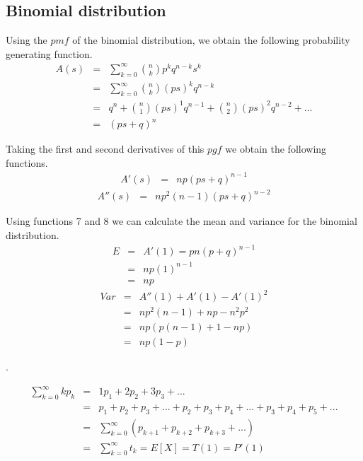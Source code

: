 \documentclass[a4paper, 10pt]{article}
\newcounter{prob_num}
\newcommand{\problem}{\vspace{20pt}\arabic{prob_num}.\stepcounter{prob_num}\par}
\begin{document}
\subsection*{Binomial distribution}
Using the $pmf$ of the binomial distribution, we obtain the following probability generating function.
\begin{eqnarray}
  A(s) &=& \sum_{k=0}^{\infty}\binom{n}{k}p^{k}q^{n-k}s^k \nonumber \\
       &=& \sum_{k=0}^{\infty}\binom{n}{k}(ps)^{k}q^{n-k} \nonumber \\
       &=& q^n + \binom{n}{1}(ps)^1 q^{n-1} + \binom{n}{2}(ps)^2 q^{n-2} + ... \nonumber \\
       &=& (ps + q)^n
\end{eqnarray}

Taking the first and second derivatives of this $pgf$ we obtain the following functions.
\begin{eqnarray}
A'(s) &=& np(ps + q)^{n-1}
\end{eqnarray}
\begin{eqnarray}
A''(s) &=& n p^2(n-1)(ps + q)^{n-2}
\end{eqnarray}

Using functions 7 and 8 we can calculate the mean and variance for the binomial distribution.
\begin{eqnarray}
E &=& A'(1) = pn (p + q)^{n-1} \nonumber \\
  &=& np (1)^{n-1} \nonumber \\
  &=& np
\end{eqnarray}
\begin{eqnarray}
Var &=& A''(1) + A'(1) - A'(1)^2 \nonumber \\
    &=& n p^2 (n-1) + np - n^2 p^2 \nonumber \\
    &=& np( p(n-1) + 1 - np ) \nonumber \\
    &=& np( 1-p )
\end{eqnarray}

\problem

\begin{eqnarray}
  \sum_{k=0}^{\infty} k p_k &=& 1p_1 + 2p_2 + 3p_3 +... \nonumber \\
                            &=& p_1 + p_2 + p_3 + ... + p_2 + p_3 + p_4 + ... + p_3 + p_4 + p_5 + ... \nonumber \\
                            &=& \sum_{k=0}^{\infty}(p_{k+1} + p_{k+2} + p_{k+3} + ...) \nonumber \\
                            &=& \sum_{k=0}^{\infty}t_k = E[X] = T(1) = P'(1)
\end{eqnarray}
\end{document}
